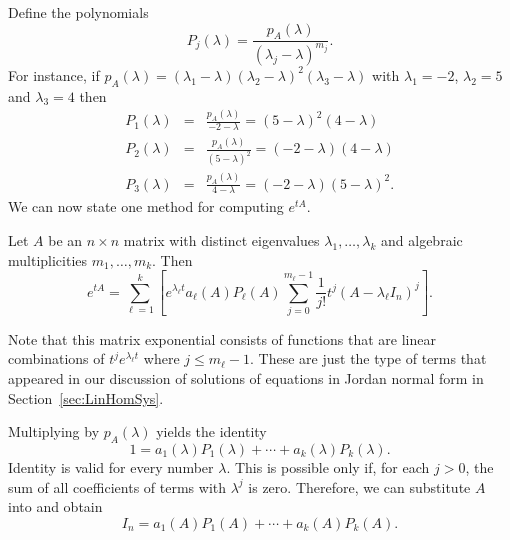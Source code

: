 \documentclass{ximera}
\begin{document}
Define the polynomials 
\begin{equation}  \label{e:Pj}
P_j(\lambda) = \frac{p_A(\lambda)}{(\lambda_j-\lambda)^{m_j}}.
\end{equation}
For instance, if 
$p_A(\lambda)=(\lambda_1-\lambda)(\lambda_2-\lambda)^2(\lambda_3-\lambda)$ 
with $\lambda_1 = -2$, $\lambda_2 = 5$ and $\lambda_3 = 4$ then
\begin{eqnarray*}
P_1(\lambda) &=& \frac{p_A(\lambda)}{-2-\lambda}=(5-\lambda)^2(4-\lambda)\\
P_2(\lambda) &=& \frac{p_A(\lambda)}{(5-\lambda)^2}=(-2-\lambda)(4-\lambda)\\
P_3(\lambda) &=& \frac{p_A(\lambda)}{4-\lambda}=(-2-\lambda)(5-\lambda)^2.
\end{eqnarray*}
We can now state one method for computing $e^{tA}$.
\begin{thm} \label{T:etA}
Let $A$ be an $n\times n$ matrix with distinct eigenvalues 
$\lambda_1,\ldots,\lambda_k$ and algebraic multiplicities $m_1,\ldots,m_k$.  
Then
\[
e^{tA} = \sum_{\ell=1}^k \left[e^{\lambda_\ell t}a_\ell(A)P_\ell(A)
\sum_{j=0}^{m_\ell-1}\frac{1}{j!}t^j(A-\lambda_\ell I_n)^j\right].
\]
\end{thm}

Note that this matrix exponential consists of functions that are linear 
combinations of $t^je^{\lambda_\ell t}$ where $j\leq m_\ell-1$.  These
are just the type of terms that appeared in our discussion of solutions 
of equations in Jordan normal form in Section~\ref{sec:LinHomSys}.

\proof Multiplying  by $p_A(\lambda)$ yields the identity
\begin{equation}  \label{e:p=aP}
1 = a_1(\lambda)P_1(\lambda) + \cdots + a_k(\lambda)P_k(\lambda).
\end{equation}
Identity  is valid for every number $\lambda$.  This is 
possible only if, for each $j>0$, the sum of all coefficients of terms 
with $\lambda^j$ is zero.  Therefore, we can substitute $A$ into 
 and obtain
\begin{equation}  \label{e:p=AP}
I_n = a_1(A)P_1(A) + \cdots + a_k(A)P_k(A).
\end{equation}
\end{document}
